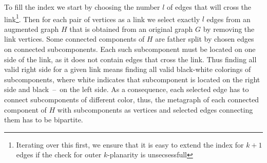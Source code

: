 To fill the index we start by choosing the number \(l\) of edges that will cross the link\footnote{Iterating over this first, we ensure that it is easy to extend the index for \(k+1\) edges if the check for outer \(k\)-planarity is unsecsessfull}. Then for each pair of vertices as a link we select exactly \(l\) edges from an augmented graph \(H\) that is obtained from an original graph \(G\) by removing the link vertices. Some connected components of \(H\) are father split by chosen edges on connected subcomponents. Each such subcomponent must be located on one side of the link, as it does not contain edges that cross the link. Thus finding all valid right side for a given link means finding all valid black-white colorings of subcomponents, where white indicates that subcomponent is located on the right side and black~--~on the left side. As a consequence, each selected edge has to connect subcomponents of different color, thus, the metagraph of each connected component of \(H\) with subcomponents as vertices and selected edges connecting them has to be bipartite.
